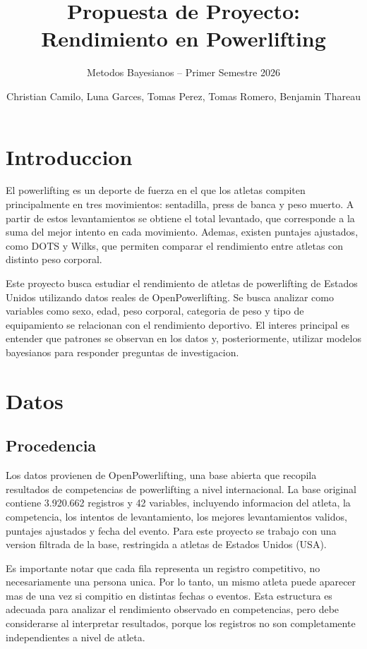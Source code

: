 \documentclass[
  spanish,
]{article}
\title{Propuesta de Proyecto: Rendimiento en Powerlifting}
\subtitle{Metodos Bayesianos -- Primer Semestre 2026}
\author{Christian Camilo, Luna Garces, Tomas Perez, Tomas Romero,
Benjamin Thareau}
\date{}
\begin{document}
\maketitle

\section{Introduccion}\label{introduccion}

El powerlifting es un deporte de fuerza en el que los atletas compiten
principalmente en tres movimientos: sentadilla, press de banca y peso
muerto. A partir de estos levantamientos se obtiene el total levantado,
que corresponde a la suma del mejor intento en cada movimiento. Ademas,
existen puntajes ajustados, como DOTS y Wilks, que permiten comparar el
rendimiento entre atletas con distinto peso corporal.

Este proyecto busca estudiar el rendimiento de atletas de powerlifting
de Estados Unidos utilizando datos reales de OpenPowerlifting. Se busca
analizar como variables como sexo, edad, peso corporal, categoria de
peso y tipo de equipamiento se relacionan con el rendimiento deportivo.
El interes principal es entender que patrones se observan en los datos
y, posteriormente, utilizar modelos bayesianos para responder preguntas
de investigacion.

\section{Datos}\label{datos}

\subsection{Procedencia}\label{procedencia}

Los datos provienen de OpenPowerlifting, una base abierta que recopila
resultados de competencias de powerlifting a nivel internacional. La
base original contiene 3.920.662 registros y 42 variables, incluyendo
informacion del atleta, la competencia, los intentos de levantamiento,
los mejores levantamientos validos, puntajes ajustados y fecha del
evento. Para este proyecto se trabajo con una version filtrada de la
base, restringida a atletas de Estados Unidos (USA).

Es importante notar que cada fila representa un registro competitivo, no
necesariamente una persona unica. Por lo tanto, un mismo atleta puede
aparecer mas de una vez si compitio en distintas fechas o eventos. Esta
estructura es adecuada para analizar el rendimiento observado en
competencias, pero debe considerarse al interpretar resultados, porque
los registros no son completamente independientes a nivel de atleta.
\end{document}
